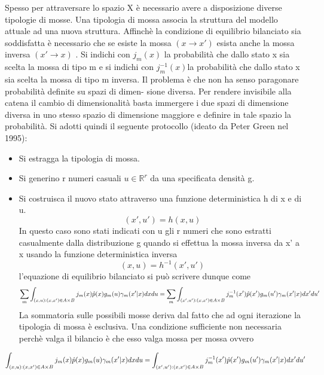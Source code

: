 Spesso per attraversare lo spazio X è necessario avere a disposizione diverse tipologie di mosse.
Una tipologia di mossa associa la struttura del modello attuale ad una nuova struttura.
Affinchè la condizione di equilibrio bilanciato sia soddisfatta è necessario che se esiste la mossa $( x \rightarrow x' )$ esista anche la mossa inversa $(x' \rightarrow x)$ .
Si indichi con $j_m (x)$ la probabilità che dallo stato x sia scelta la mossa di tipo m e
si indichi con $j_m^{-1}
(x ) $la probabilità che dallo stato x sia scelta la mossa di tipo m
inversa.
Il problema è che non ha senso paragonare probabilità definite su spazi di dimen-
sione diversa.
Per rendere invisibile alla catena il cambio di dimensionalità basta immergere i due
spazi di dimensione diversa in uno stesso spazio di dimensione maggiore e definire
in tale spazio la probabilità.
Si adotti quindi il seguente protocollo (ideato da Peter Green nel 1995):
\begin{itemize}
\item Si estragga la tipologia di mossa.
\item Si generino r numeri casuali $u\in\mathbb{R}^r$ da una specificata densità g.
\item Si costruisca il nuovo stato attraverso una funzione deterministica h di x e di u.
\begin{equation}
(x' , u' ) = h(x, u)
\end{equation}
In questo caso sono stati indicati con u gli r numeri che sono estratti casualmente
dalla distribuzione g quando si effettua la mossa inversa da x' a x usando la funzione
deterministica inversa
\begin{equation}
(x, u) = h ^{-1}(x' , u ')
\end{equation}
l’equazione di equilibrio bilanciato si può scrivere dunque come
\begin{equation*}
\sum_m \int_{(x,u):(x,x')\in A\times B}j_m(x)\hat{p}(x)g_m(u)\gamma_m(x'|x)dxdu=
\sum_m \int_{(x',u'):(x,x')\in A\times B}j_m^{-1}(x')\hat{p}(x')g_m(u')\gamma_m(x'|x)dx'du'
\end{equation*}
La sommatoria sulle possibili mosse deriva dal fatto che ad ogni iterazione la tipologia di mossa è esclusiva. Una condizione sufficiente non necessaria perchè valga il
bilancio è che esso valga mossa per mossa ovvero
\end{itemize}
\begin{equation*}
 \int_{(x,u):(x,x')\in A\times B}j_m(x)\hat{p}(x)g_m(u)\gamma_m(x'|x)dxdu=
 \int_{(x',u'):(x,x')\in A\times B}j_m^{-1}(x')\hat{p}(x')g_m(u')\gamma_m(x'|x)dx'du'
\end{equation*}
